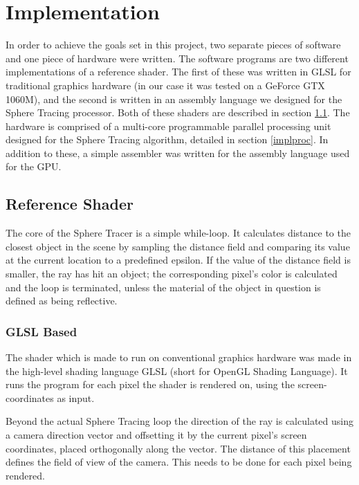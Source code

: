 \chapter{Implementation}

	In order to achieve the goals set in this project, two separate pieces of 
	software and one piece of hardware were written. The software programs are 
	two different implementations of a reference shader. The first of these was 
	written in GLSL for traditional graphics hardware (in our case it was 
	tested on a GeForce GTX 1060M), and the second is written in an assembly 
	language we designed for the Sphere Tracing processor. Both of these 
	shaders are described in section \ref{implshader}. The hardware is 
	comprised of a multi-core programmable parallel processing unit designed 
	for the Sphere Tracing algorithm, detailed in section \ref{implproc}. In 
	addition to these, a simple assembler was written for the assembly language
	used for the GPU.

	\section{Reference Shader} \label{implshader}

		The core of the Sphere Tracer is a simple while-loop. It calculates
		distance to the closest object in the scene by sampling the distance
		field and comparing its value at the current location to a predefined
		epsilon. If the value of the distance field is smaller, the ray has hit
		an object; the corresponding pixel's color is calculated and the loop
		is terminated, unless the material of the object in question is defined
		as being reflective.

		\subsection{GLSL Based}

			The shader which is made to run on conventional graphics hardware
			was made in the high-level shading language GLSL (short for OpenGL
			Shading Language). It runs the program for each pixel the shader is
			rendered on, using the screen-coordinates as input.

			Beyond the actual Sphere Tracing loop the direction of the ray is
			calculated using a camera direction vector and offsetting it by the
			current pixel's screen coordinates, placed orthogonally along the
			vector.  The distance of this placement defines the field of view
			of the camera. This needs to be done for each pixel being rendered.

